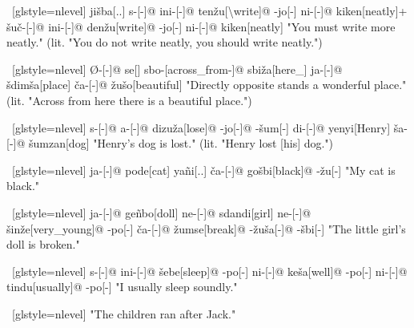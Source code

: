 \ex~[glstyle=nlevel]
\begingl
\glpreamble {}
\endpreamble
ji\v{s}ba[{\Spol}.{\Hg}.{\Erg}]
s-[{\Ind}-]@
ini-[{\Hab}-]@
ten\v{z}u[{\Neg}\textbackslash write]@
-jo[-\Hg]
ni-[{\Hab}-]@
kiken[neatly]+
\v{s}u\v{c}-[{\Deo}-]@
ini-[{\Hab}-]@
den\v{z}u[write]@
-jo[-\Hg]
ni-[{\Hab}-]@
kiken[neatly]
\glft "You must write more neatly." (lit. "You do not write neatly, you should write neatly.")
\endgl
\xe

\ex~[glstyle=nlevel]
\begingl
\glpreamble {}
\endpreamble
Ø-[{\Ind}-]@
se[{\Cop}]
sbo-[across\_from-]@
sbi\v{z}a[here\_{\Prox}]
ja-[{\Nom}-]@
\v{s}dim\v{s}a[place]
\v{c}a-[{\Nom}-]@
\v{z}u\v{s}o[beautiful]
\glft "Directly opposite stands a wonderful place." (lit. "Across from here there is a beautiful place.")
\endgl
\xe

\ex~[glstyle=nlevel]
\begingl
\glpreamble {}
\endpreamble
s-[{\Ind}-]@
a-[{\Prog}-]@
dizu\v{z}a[lose]@
-jo[-{\Hg}]@
-\v{s}um[-{\An}]
di-[{\Erg}-]@
yenyi[Henry]
\v{s}a-[{\Acc}-]@
\v{s}umzan[dog]
\glft "Henry's dog is lost." (lit. "Henry lost [his] dog.")
\endgl
\xe

\ex~[glstyle=nlevel]
\begingl
\glpreamble {}
\endpreamble
ja-[{\Nom}-]@
pode[cat]
yañi[{\Fex}.{\Hg}.{\Gen}]
\v{c}a-[{\Nom}-]@
go\v{s}bi[black]@
-\v{z}u[-{\An}]
\glft "My cat is black."
\endgl
\xe

\ex~[glstyle=nlevel]
\begingl
\glpreamble {}
\endpreamble
ja-[{\Nom}-]@
geñbo[doll]
ne-[{\Gen}-]@
sdandi[girl]
ne-[{\Gen}-]@
\v{s}in\v{z}e[very\_young]@
-po[-{\Hg}]
\v{c}a-[{\Nom}-]@
\v{z}umse[break]@
-\v{z}u\v{s}a[-{\Adjz}]@
-\v{s}bi[-{\Inan}]
\glft "The little girl's doll is broken."
\endgl
\xe

\ex~[glstyle=nlevel]
\begingl
\glpreamble {}
\endpreamble
s-[{\Ind}-]@
ini-[{\Hab}-]@
\v{s}ebe[sleep]@
-po[-{\Hg}]
ni-[{\Hab}-]@
ke\v{s}a[well]@
-po[-{\Hg}]
ni-[{\Hab}-]@
tindu[usually]@
-po[-{\Hg}]
\glft "I usually sleep soundly."
\endgl
\xe

\ex~[glstyle=nlevel]
\begingl
\glpreamble \SGwithRom{}
\endpreamble
\glft "The children ran after Jack."
\endgl
\xe


\endgroup
\iffalse


\ex~[glstyle=nlevel]
\begingl
\glpreamble \SGwithRom{}
\endpreamble

\glft ""
\endgl
\xe


\fi
